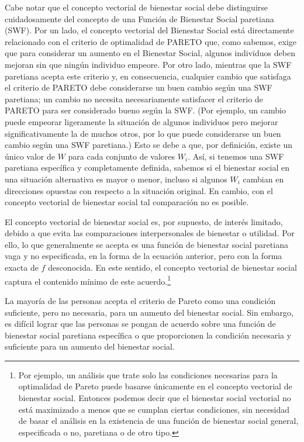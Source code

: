 \documentclass[10pt,a4paper]{article}
\begin{document}
Cabe notar que el concepto vectorial de bienestar social debe distinguirse cuidadosamente del concepto de una Función de Bienestar Social paretiana (SWF). Por un lado, el concepto vectorial del Bienestar Social está directamente relacionado con el criterio de optimalidad de PARETO que, como sabemos, exige que para considerar un aumento en el Bienestar Social, algunos individuos deben mejoran sin que ningún individuo empeore. Por otro lado, mientras que la SWF paretiana acepta este criterio y, en consecuencia, cualquier cambio que satisfaga el criterio de PARETO debe considerarse un buen cambio según una SWF paretiana; un cambio no necesita necesariamente satisfacer el criterio de PARETO para ser considerado bueno según la SWF. (Por ejemplo, un cambio puede empeorar ligeramente la situación de algunos individuos pero mejorar significativamente la de muchos otros, por lo que puede considerarse un buen cambio según una SWF paretiana.) Esto se debe a que, por definición, existe un único valor de $W$ para cada conjunto de valores $W_i$. Así, si tenemos una SWF paretiana específica y completamente definida, sabemos si el bienestar social en una situación alternativa es mayor o menor, incluso si algunos $W_i$ cambian en direcciones opuestas con respecto a la situación original. En cambio, con el concepto vectorial de bienestar social tal comparación no es posible. 

El concepto vectorial de bienestar social es, por supuesto, de interés limitado, debido a que evita las comparaciones interpersonales de bienestar o utilidad. Por ello, lo que generalmente se acepta es una función de bienestar social paretiana vaga y no especificada, en la forma de la ecuación anterior, pero con la forma exacta de $f$ desconocida. En este sentido, el concepto vectorial de bienestar social captura el contenido mínimo de este acuerdo.\footnote{%
    Por ejemplo, un análisis que trate solo las condiciones necesarias para la optimalidad de Pareto puede basarse únicamente en el concepto vectorial de bienestar social. Entonces podemos decir que el bienestar social vectorial no está maximizado a menos que se cumplan ciertas condiciones, sin necesidad de basar el análisis en la existencia de una función de bienestar social general, especificada o no, paretiana o de otro tipo.
}

La mayoría de las personas acepta el criterio de Pareto como una condición suficiente, pero no necesaria, para un aumento del bienestar social. Sin embargo, es difícil lograr que las personas se pongan de acuerdo sobre una función de bienestar social paretiana específica o que proporcionen la condición necesaria y suficiente para un aumento del bienestar social. 
\end{document}
